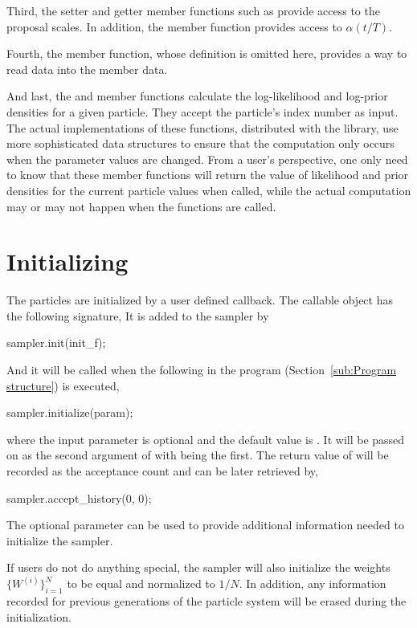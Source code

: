 Third, the setter and getter member functions such as  provide access to the proposal scales. In addition, the member function  provides access to $\alpha(t/T)$.

Fourth, the  member function, whose definition is omitted here, provides a way to read data into the  member data.

And last, the  and  member functions calculate the log-likelihood and log-prior densities for a given particle. They accept the particle's index number as input. The actual implementations of these functions, distributed with the library, use more sophisticated data structures to ensure that the computation only occurs when the parameter values are changed. From a user's perspective, one only need to know that these member functions will return the value of likelihood and prior densities for the current particle values when called, while the actual computation may or may not happen when the functions are called.

\section{Initializing}
\label{sec:Initializing}

The particles are initialized by a user defined callback. The callable object has the following signature,
It is added to the sampler by
\begin{cppcode}
sampler.init(init_f);
\end{cppcode}
And it will be called when the following in the program
(Section~\ref{sub:Program structure}) is executed,
\begin{cppcode}
sampler.initialize(param);
\end{cppcode}
where the input parameter  is optional and the default value is . It will be passed on as the second argument of  with  being the first. The return value of  will be recorded as the acceptance count and can be later retrieved by,
\begin{cppcode}
sampler.accept_history(0, 0);
\end{cppcode}
The optional parameter can be used to provide additional information needed to initialize the sampler.

If users do not do anything special, the sampler will also initialize the weights $\{W^{(i)}\}_{i=1}^N$ to be equal and normalized to $1/N$. In addition, any information recorded for previous generations of the particle system will be erased during the initialization.

